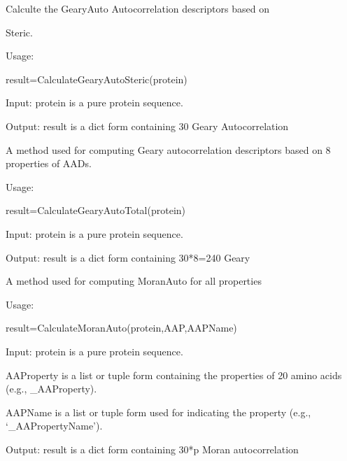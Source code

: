 \documentclass[letterpaper,10pt,english]{sphinxmanual}
\begin{document}

\begin{fulllineitems}
\label{reference/Autocorrelation:Autocorrelation.CalculateGearyAutoSteric}
Calculte the GearyAuto Autocorrelation descriptors based on

Steric.

Usage:

result=CalculateGearyAutoSteric(protein)

Input: protein is a pure protein sequence.

Output: result is a dict form containing 30 Geary Autocorrelation

\end{fulllineitems}


\begin{fulllineitems}
\label{reference/Autocorrelation:Autocorrelation.CalculateGearyAutoTotal}
A method used for computing Geary autocorrelation descriptors based on 8 properties of AADs.

Usage:

result=CalculateGearyAutoTotal(protein)

Input: protein is a pure protein sequence.

Output: result is a dict form containing 30*8=240 Geary

\end{fulllineitems}


\begin{fulllineitems}
\label{reference/Autocorrelation:Autocorrelation.CalculateMoranAuto}
A method used for computing MoranAuto for all properties

Usage:

result=CalculateMoranAuto(protein,AAP,AAPName)

Input: protein is a pure protein sequence.

AAProperty is a list or tuple form containing the properties of 20 amino acids (e.g., \_AAProperty).

AAPName is a list or tuple form used for indicating the property (e.g., `\_AAPropertyName').

Output: result is a dict form containing 30*p Moran autocorrelation

\end{fulllineitems}
\end{document}
